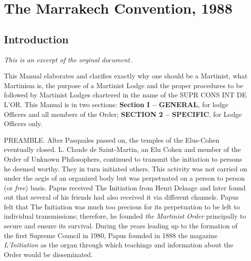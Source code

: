 \chapter{The Marrakech Convention, 1988}
\section{Introduction}
\textit{This is an excerpt of the orginal document.}

This Manual elaborates and clarifies exactly why one should be a Martinist, what Martinism is, the purpose of a Martinist Lodge and the proper procedures to be followed by Martinist Lodges chartered in the name of the SUPR\hexdot{} CONS\hexdot{} INT\hexdot{} DE L’OR\hexdot{}. This Manual is in two sections: \textbf{Section I – GENERAL}, for lodge Officers and all members of the Order; \textbf{SECTION 2 – SPECIFIC}, for Lodge Officers only. 

PREAMBLE. After Pasquales passed on, the temples of the Elus-Cohen eventually
closed. L. Claude de Saint-Martin, an Elu Cohen and member of the Order of Unknown
Philosophers, continued to transmit the \si{} initiation to persons he deemed worthy.
They in turn initiated others. This activity was not carried on under the aegis of an
organized body but was perpetuated on a person to person (or \textit{free}) basis. Papus received The
Initiation from Henri Delaage and later found out that several of his friends had also
received it via different channels. Papus felt that The Initiation was much too precious for
its perpetuation to be left to individual transmissions; therefore, he founded \textit{the Martinist
Order} principally to secure and ensure its survival. During the years leading up to the
formation of the first Supreme Council in 1980, Papus founded in 1888 the magazine
\textit{L’Initiation} as the organ through which teachings and information about the Order would be
disseminated.

